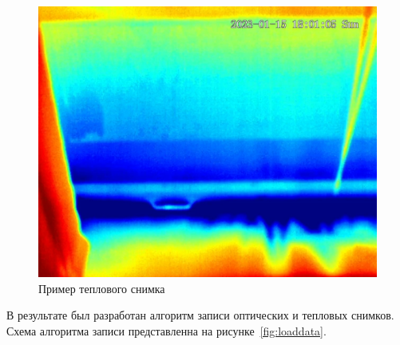 \documentclass[14pt, a4paper]{extreport}
\begin{document}
	\begin{figure}[h!]
		\centering
		\includegraphics[width = 13cm]{image/chapter_2/tep_example}	
		\caption{Пример теплового снимка}
		\label{fig:tep_example}
	\end{figure}

	В результате был разработан алгоритм записи оптических и тепловых снимков. Схема алгоритма записи представленна на рисунке~\ref{fig:loaddata}.
	
\end{document}
